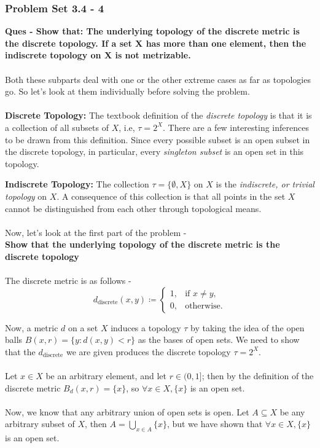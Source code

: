 
\begin{frame}
    \frametitle{Problem Set 3.4 - 4}
    \textbf{Ques - Show that: The underlying topology of the discrete metric is the discrete topology. If a set X has more than one element, then the indiscrete topology on X is not metrizable.}\\\\
    Both these subparts deal with one or the other extreme cases as far as topologies go. So let's look at them individually before solving the problem.\\\\
    \textbf{Discrete Topology:} The textbook definition of the \textit{discrete topology} is that it is a collection of all subsets of $X$, i.e, $\tau = 2^{X}$. There are a few interesting inferences to be drawn from this definition. Since every possible subset is an open subset in the discrete topology, in particular, every \textit{singleton subset} is an open set in this topology.
\end{frame}

\begin{frame}
    \textbf{Indiscrete Topology:} The collection $\tau = \{ \emptyset , X \}$ on $X$ is the \textit{indiscrete, or trivial topology} on $X$. A consequence of this collection is that all points in the set $X$ cannot be distinguished from each other through topological means.\\\\
    Now, let's look at the first part of the problem - \\
    \textbf{Show that the underlying topology of the discrete metric is the discrete topology} \\\\
    The discrete metric is as follows - \\
    \[
        d_{\text{discrete}}(x,y) \coloneqq 
        \begin{cases}
            1, & \text{if } x \neq y, \\
            0, & \text{otherwise}.
        \end{cases}
    \]
\end{frame}

\begin{frame}
    Now, a metric $d$ on a set $X$ induces a topology $\tau$ by taking the idea of the open balls $B(x,r) = \{y : d(x,y) < r\}$ as the bases of open sets. We need to show that the $d_{\text{discrete}}$ we are given produces the discrete topology $\tau = 2^{X}$.\\\\
    Let $x \in X$ be an arbitrary element, and let $r \in (0, 1]$; then by the definition of the discrete metric $B_d(x,r) = \{x\}$, so $\forall x \in X, \{x\}$ is an open set.\\\\
    Now, we know that any arbitrary union of open sets is open. Let $A \subseteq X$ be any arbitrary subset of $X$, then $A = \bigcup_{x \in A} \{x\}$, but we have shown that $\forall x \in X, \{x\}$ is an open set.
\end{frame}

